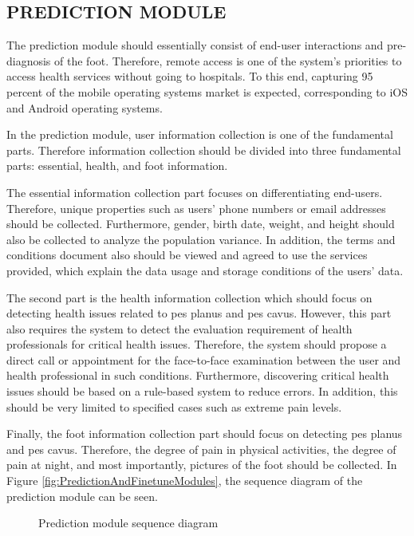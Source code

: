 \subsection{ PREDICTION MODULE }

The prediction module should essentially consist of end-user interactions and pre-diagnosis of the foot. Therefore, remote access is one of the system's priorities to access health services without going to hospitals. To this end, capturing 95 percent of the mobile operating systems market is expected, corresponding to iOS and Android operating systems.

In the prediction module, user information collection is one of the fundamental parts. Therefore information collection should be divided into three fundamental parts: essential, health, and foot information. 

The essential information collection part focuses on differentiating end-users. Therefore, unique properties such as users' phone numbers or email addresses should be collected. Furthermore, gender, birth date, weight, and height should also be collected to analyze the population variance. In addition, the terms and conditions document also should be viewed and agreed to use the services provided, which explain the data usage and storage conditions of the users' data.

The second part is the health information collection which should focus on detecting health issues related to pes planus and pes cavus. However, this part also requires the system to detect the evaluation requirement of health professionals for critical health issues. Therefore, the system should propose a direct call or appointment for the face-to-face examination between the user and health professional in such conditions. Furthermore, discovering critical health issues should be based on a rule-based system to reduce errors. In addition, this should be very limited to specified cases such as extreme pain levels.

Finally, the foot information collection part should focus on detecting pes planus and pes cavus. Therefore, the degree of pain in physical activities, the degree of pain at night, and most importantly, pictures of the foot should be collected. In Figure \ref{fig:PredictionAndFinetuneModules}, the sequence diagram of the prediction module can be seen.

\begin{figure}[htbp]
\centering
{}
\caption{Prediction module sequence diagram}
\label{fig:PredictionModuleSequenceDiagram}
\end{figure}


